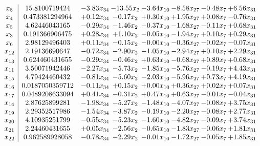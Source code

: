 \documentclass[8pt]{article}
\begin{document}
\[\begin{array}{c| c c@{\hskip 2pt} c@{\hskip 2pt} c@{\hskip 2pt} c@{\hskip 2pt} c@{\hskip 2pt} c@{\hskip 2pt} }
 x_{8}   &  15.8100719424 & -3.83 x_{34} & -13.55 x_{2} & -3.64 x_{10} & -8.58 x_{27} & -0.48 x_{7} & +  6.56 x_{31}\\
 x_{4}   &  0.473381294964 & +  0.12 x_{34} & -0.17 x_{2} & +  0.30 x_{10} & +  1.95 x_{27} & +  0.08 x_{7} & -0.76 x_{31}\\
 x_{5}   &  4.62446043165 & -0.29 x_{34} & -1.46 x_{2} & -0.37 x_{10} & -1.68 x_{27} & -0.11 x_{7} & +  0.68 x_{31}\\
 x_{3}   &  0.191366906475 & +  0.28 x_{34} & +  1.10 x_{2} & -0.05 x_{10} & -1.94 x_{27} & +  0.10 x_{7} & +  0.29 x_{31}\\
 x_{6}   &  2.98129496403 & +  0.11 x_{34} & -0.15 x_{2} & -0.00 x_{10} & -0.36 x_{27} & -0.02 x_{7} & -0.07 x_{31}\\
 x_{12}   &  2.19136690647 & -0.72 x_{34} & -2.90 x_{2} & -1.05 x_{10} & -2.94 x_{27} & +  0.10 x_{7} & +  2.29 x_{31}\\
 x_{13}   &  0.624460431655 & -0.29 x_{34} & -0.46 x_{2} & +  0.63 x_{10} & -0.68 x_{27} & +  0.89 x_{7} & +  0.68 x_{31}\\
 x_{11}   &  3.50071942446 & -2.27 x_{34} & -5.73 x_{2} & -1.85 x_{10} & -5.76 x_{27} & -0.19 x_{7} & +  4.43 x_{31}\\
 x_{15}   &  4.79424460432 & -0.81 x_{34} & -5.60 x_{2} & -2.03 x_{10} & -5.96 x_{27} & +  0.73 x_{7} & +  4.19 x_{31}\\
 x_{16}   &  0.0187050359712 & -0.11 x_{34} & +  0.15 x_{2} & +  0.00 x_{10} & +  0.36 x_{27} & +  0.02 x_{7} & +  0.07 x_{31}\\
 x_{17}   &  0.0489208633094 & +  0.41 x_{34} & -0.31 x_{2} & +  0.47 x_{10} & +  0.63 x_{27} & -0.01 x_{7} & -0.04 x_{31}\\
 x_{14}   &  2.87625899281 & -1.98 x_{34} & -5.27 x_{2} & -1.48 x_{10} & -4.07 x_{27} & -0.08 x_{7} & +  3.75 x_{31}\\
 x_{19}   &  2.29352517986 & -1.54 x_{34} & -3.87 x_{2} & -0.19 x_{10} & -2.20 x_{27} & -0.08 x_{7} & +  2.77 x_{31}\\
 x_{20}   &  4.10935251799 & -0.55 x_{34} & -5.23 x_{2} & -1.60 x_{10} & -4.82 x_{27} & -0.09 x_{7} & +  3.74 x_{31}\\
 x_{21}   &  2.24460431655 & +  0.05 x_{34} & -2.56 x_{2} & -0.65 x_{10} & -1.83 x_{27} & -0.06 x_{7} & +  1.81 x_{31}\\
 x_{22}   &  0.962589928058 & -0.78 x_{34} & -2.29 x_{2} & -0.01 x_{10} & -1.72 x_{27} & -0.05 x_{7} & +  1.85 x_{31}\\

\end{array}\]
\end{document}
